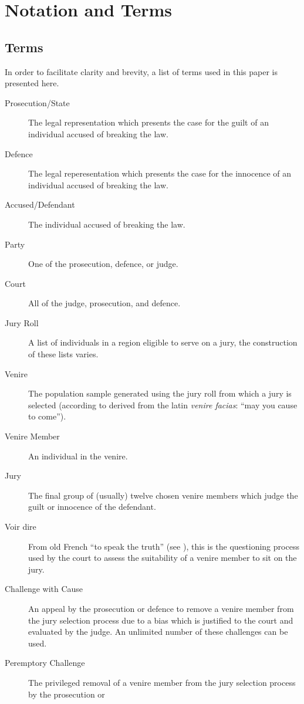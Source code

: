 \chapter*{Notation and Terms}
\label{c:Notation}

\section*{Terms}

In order to facilitate clarity and brevity, a list of terms used in this paper is presented here.

\begin{description}
\item[Prosecution/State] The legal representation which presents the case for the guilt of an individual accused of breaking the law.
\item[Defence] The legal reperesentation which presents the case for the innocence of an individual accused of breaking the law.
\item[Accused/Defendant] The individual accused of breaking the law.
\item[Party] One of the prosecution, defence, or judge.
\item[Court] All of the judge, prosecution, and defence.
\item[Jury Roll] A list of individuals in a region eligible to serve on a jury, the construction of these lists varies.
\item[Venire] The population sample generated using the jury roll from which a jury is selected (according to \cite{venireety}
  derived from the latin \textit{venire facias}: ``may you cause to come'').
\item[Venire Member] An individual in the venire.
\item[Jury] The final group of (usually) twelve chosen venire members which judge the guilt or innocence of the
    defendant.
\item[Voir dire] From old French ``to speak the truth'' (see \cite{voirety}), this is the questioning process used by the court to
  assess the suitability of a venire member to sit on the jury.
\item[Challenge with Cause] An appeal by the prosecution or defence to remove a venire member from the jury selection process due
  to a bias which is justified to the court and evaluated by the
  judge. An unlimited number of these challenges can be used.
\item[Peremptory Challenge] The privileged removal of a venire member from the jury selection process by the prosecution or

\end{description}
